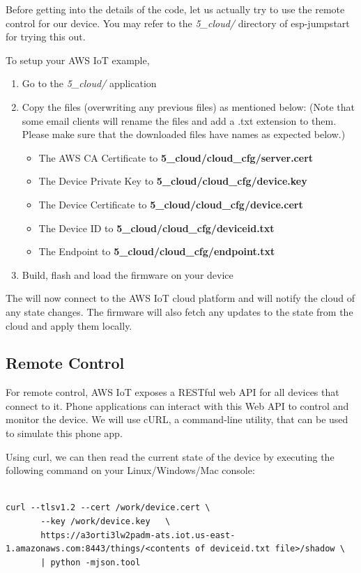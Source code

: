 \documentclass[main.tex]{subfiles}
\begin{document}
Before getting into the details of the code, let us actually try to use the remote control for our device.
You may refer to the \textit{5\_cloud/} directory of esp-jumpstart for trying this out.

To setup your AWS IoT example, 
\begin{enumerate}
    \item Go to the \textit{5\_cloud/} application
    \item Copy the files (overwriting any previous files) as mentioned below: (Note that some email clients will rename the files and add a .txt extension to them. Please make sure that the downloaded files have names as expected below.)
    \begin{itemize}
        \item The AWS CA Certificate to \textbf{5\_cloud/cloud_cfg/server.cert}
        \item The Device Private Key to \textbf{5\_cloud/cloud_cfg/device.key}
        \item The Device Certificate to \textbf{5\_cloud/cloud_cfg/device.cert}
        \item The Device ID to \textbf{5\_cloud/cloud_cfg/deviceid.txt}
        \item The Endpoint to \textbf{5\_cloud/cloud_cfg/endpoint.txt}
    \end{itemize}
    \item Build, flash and load the firmware on your device
\end{enumerate}

The will now connect to the AWS IoT cloud platform and will notify the cloud of any state changes. The firmware will also fetch any updates to the state from the cloud and apply them locally. 

\subsection{Remote Control}
For remote control, AWS IoT exposes a RESTful web API for all devices that connect to it. Phone applications can interact with this Web API to control and monitor the device. We will use cURL, a command-line utility, that can be used to simulate this phone app. 

Using curl, we can then read the current state of the device by executing the following command on your Linux/Windows/Mac console:
\begin{verbatim}

curl --tlsv1.2 --cert /work/device.cert \
       --key /work/device.key   \
       https://a3orti3lw2padm-ats.iot.us-east-1.amazonaws.com:8443/things/<contents of deviceid.txt file>/shadow \ 
       | python -mjson.tool

\end{verbatim}
\end{document}
